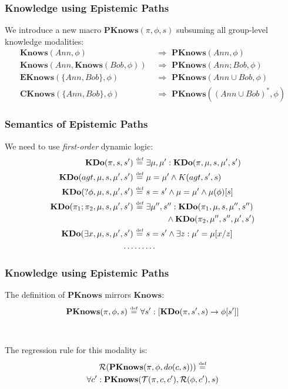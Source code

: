 \documentclass[compress]{beamer}
\newcommand{\isdef}{\hbox{$\stackrel{\mbox{\tiny def}}{=}$}}
\newcommand{\Reg}{\mathcal{R}}
\newcommand{\Trn}{\mathcal{T}}
\newcommand{\EKnows}{\mathbf{EKnows}}
\newcommand{\Knows}{\mathbf{Knows}}
\newcommand{\CKnows}{\mathbf{CKnows}}
\newcommand{\PKnows}{\mathbf{PKnows}}
\newcommand{\KDo}{\mathbf{KDo}}
\begin{document}
\begin{frame}
\frametitle{Knowledge using Epistemic Paths}
We introduce a new macro $\PKnows(\pi,\phi,s)$ subsuming all group-level knowledge modalities:
\begin{align*}
\Knows(Ann,\phi) &  \,\,\Rightarrow\,\,\PKnows(Ann,\phi) \\
\Knows(Ann,\Knows(Bob,\phi)) & \,\,\Rightarrow\,\,\PKnows(Ann ; Bob,\phi) \\
\EKnows(\{Ann,Bob\},\phi) & \,\,\Rightarrow\,\,\PKnows(Ann \cup Bob,\phi) \\
\CKnows(\{Ann,Bob\},\phi) & \,\,\Rightarrow\,\,\PKnows((Ann \cup Bob)^*,\phi)
\end{align*}
\end{frame}

\begin{frame}
\frametitle{Semantics of Epistemic Paths}
We need to use \emph{first-order} dynamic logic:
\begin{align*}
\KDo(\pi,s,s') & \,\,\isdef\,\,\exists \mu,\mu': \KDo(\pi,\mu,s,\mu',s') \\
\KDo(agt,\mu,s,\mu',s') & \,\,\isdef\,\,\mu = \mu' \wedge K(agt,s',s) \\
\KDo(?\phi,\mu,s,\mu',s') & \,\,\isdef\,\,s = s' \wedge \mu = \mu' \wedge \mu(\phi)[s] \\
\KDo(\pi_1 ; \pi_2,\mu,s,\mu',s') & \,\,\isdef\,\,\exists \mu'',s'': \KDo(\pi_1,\mu,s,\mu'',s'') \\
\,\,  & \,\,\,\,\,\,\,\,\,\,\,\,\,\,\,\,\,\,\,\,\,\,\,\, \wedge \KDo(\pi_2,\mu'',s'',\mu',s')\\
\KDo(\exists x,\mu,s,\mu',s') & \,\,\isdef\,\,s = s' \wedge \exists z: \mu' = \mu[x/z] \\
\dots & \dots\dots
\end{align*}
\end{frame}

\begin{frame}
\frametitle{Knowledge using Epistemic Paths}
The definition of $\PKnows$ mirrors $\Knows$:
\begin{equation*}
\PKnows(\pi,\phi,s)\,\,\isdef\,\,\forall s': \left[ \KDo(\pi,s',s) \rightarrow \phi[s']\right]
\end{equation*}
\ \\
\ \\
\pause
The regression rule for this modality is:
\begin{multline*}
\Reg(\PKnows(\pi,\phi,do(c,s)))\,\,\isdef \\
  \forall c': \PKnows(\Trn(\pi,c,c'),\Reg(\phi,c'),s)
\end{multline*}
\end{frame}
\end{document}
